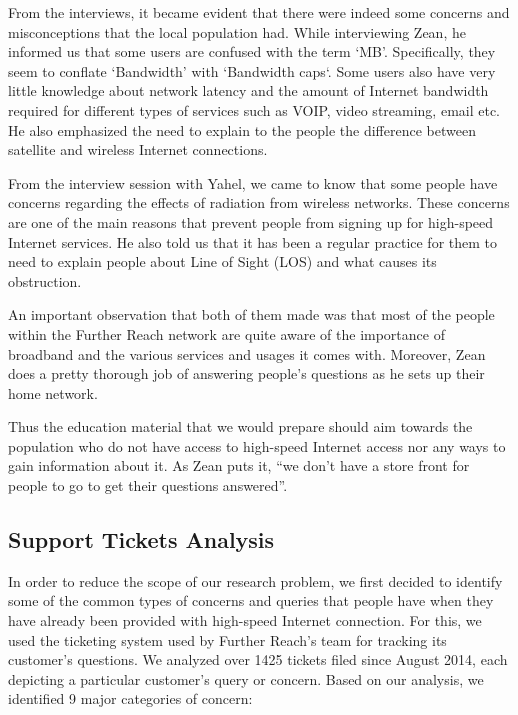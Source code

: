 From the interviews, it became evident that there were indeed some concerns
and misconceptions that the local population had. While interviewing Zean, he
informed us that some users are confused with the term `MB'. Specifically,
they seem to conflate `Bandwidth' with `Bandwidth caps`. Some users also have
very little knowledge about network latency and the amount of Internet
bandwidth required for different types of services such as VOIP, video streaming, email etc. He also emphasized the need to explain to the people the difference between satellite and wireless Internet connections.

From the interview session with Yahel, we came to know that some people have
concerns regarding the effects of radiation from wireless networks. These
concerns are one of the main reasons that prevent people from signing up for
high-speed Internet services. He also told us that it has been a regular
practice for them to need to explain people about Line of Sight (LOS) and what causes its obstruction.

An important observation that both of them made was that most of the people
within the Further Reach network are quite aware of the importance of
broadband and the various services and usages it comes with. Moreover, Zean
does a pretty thorough job of answering people's questions as he sets up their
home network.

Thus the education material that we would prepare should aim towards the
population who do not have access to high-speed Internet access nor any ways
to gain information about it. As Zean puts it, ``we don't have a store
front for people to go to get their questions answered''.

\subsection{Support Tickets Analysis}
\label{sec:supp-tick-analys}

In order to reduce the scope of our research problem, we first decided to identify some of the common types of concerns and queries that people have when they have already been provided with high-speed Internet connection. For this, we used the ticketing system used by Further Reach’s team for tracking its customer’s questions. We analyzed over 1425 tickets filed since August 2014, each depicting a particular customer’s query or concern. Based on our analysis, we identified 9 major categories of concern:



